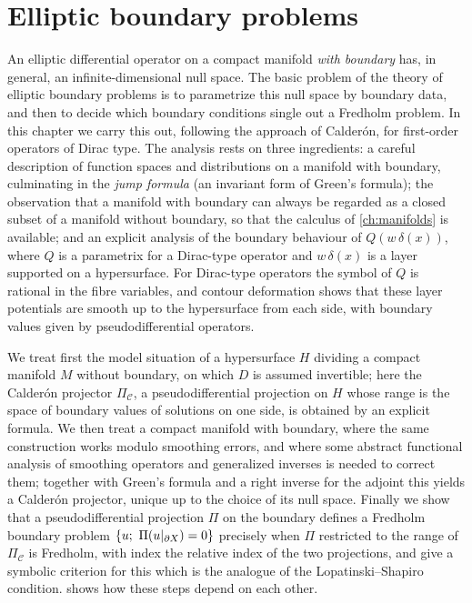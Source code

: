 \chapter{Elliptic boundary problems}\label{ch:boundary}
\providecommand{\dCmI}{\dot{\mathcal{C}}^{-\infty}}
\providecommand{\Hdot}[1]{\dot{H}^{#1}}
\providecommand{\Xt}{\tilde{X}}
\providecommand{\PiC}{\Pi_{\mathcal{C}}}
\providecommand{\Cau}{\mathfrak{C}}
\providecommand{\Rat}[1]{\mathcal{R}^{#1}}
\providecommand{\cJ}{\mathcal{J}}
\providecommand{\Fin}{\mathcal{F}}
\usetikzlibrary{decorations.markings}

An elliptic differential operator on a compact manifold \emph{with boundary} has, in
general, an infinite-dimensional null space. The basic problem of the theory of elliptic
boundary problems is to parametrize this null space by boundary data, and then to
decide which boundary conditions single out a Fredholm problem. In this chapter we
carry this out, following the approach of Calder\'on, for first-order operators of Dirac
type. The analysis rests on three ingredients: a careful description of function spaces
and distributions on a manifold with boundary, culminating in the \emph{jump formula}
(an invariant form of Green's formula); the observation that a manifold with boundary
can always be regarded as a closed subset of a manifold without boundary, so that the
calculus of \cref{ch:manifolds} is available; and an explicit analysis of the boundary
behaviour of $Q(w\,\delta(x))$, where $Q$ is a parametrix for a Dirac-type operator and
$w\,\delta(x)$ is a layer supported on a hypersurface. For Dirac-type operators the
symbol of $Q$ is rational in the fibre variables, and contour deformation shows that
these layer potentials are smooth up to the hypersurface from each side, with boundary
values given by pseudodifferential operators.

We treat first the model situation of a hypersurface $H$ dividing a compact manifold
$M$ without boundary, on which $D$ is assumed invertible; here the Calder\'on
projector $\PiC$, a pseudodifferential projection on $H$ whose range is the space of
boundary values of solutions on one side, is obtained by an explicit formula. We then
treat a compact manifold with boundary, where the same construction works modulo
smoothing errors, and where some abstract functional analysis of smoothing operators
and generalized inverses is needed to correct them; together with Green's formula and
a right inverse for the adjoint this yields a Calder\'on projector, unique up to the
choice of its null space. Finally we show that a pseudodifferential projection $\Pi$ on
the boundary defines a Fredholm boundary problem $\{u;\ \Pi(u|_{\partial X})=0\}$ precisely
when $\Pi$ restricted to the range of $\PiC$ is Fredholm, with index the relative index
of the two projections, and give a symbolic criterion for this which is the analogue of
the Lopatinski--Shapiro condition.
 shows how these steps depend on each other.

